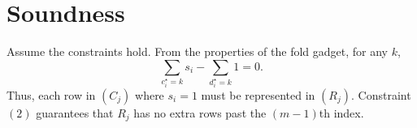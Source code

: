 \documentclass[11pt]{article}
\begin{document}
\section{Soundness}
Assume the constraints hold. From the properties of the fold gadget, for any $k$,
$$\sum_{c^\star_i=k} s_i-\sum_{d^\star_i=k}1=0.$$
Thus, each row in $(C_j)$ where $s_i=1$ must be represented in $(R_j)$. Constraint $(2)$ guarantees that $R_j$ has no extra rows past the $(m-1)$th index.
\end{document}
